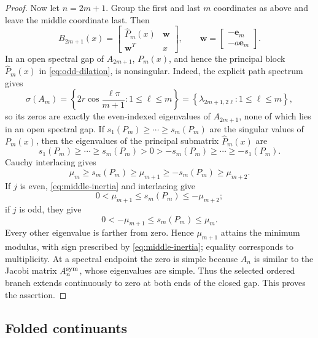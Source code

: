 \documentclass[11pt,a4paper]{article}
\numberwithin{equation}{section}
\begin{document}
\begin{proof}
Now let \(n=2m+1\).  Group the first and last \(m\) coordinates as
above and leave the middle coordinate last.  Then
\begin{equation}\label{eq:odd-dilation}
 B_{2m+1}(x)=
 \begin{bmatrix}\widehat P_m(x)&\boldsymbol w\\\boldsymbol w^T&x\end{bmatrix},
 \qquad
 \boldsymbol w=\begin{bmatrix}-\mathbf e_m\\-a\mathbf e_m\end{bmatrix}.
\end{equation}
In an open spectral gap of \(A_{2m+1}\), \(P_m(x)\), and hence the principal
block \(\widehat P_m(x)\) in \eqref{eq:odd-dilation}, is nonsingular.  Indeed,
the explicit path spectrum gives
\[
 \sigma(A_m)
 =\left\{2r\cos\frac{\ell\pi}{m+1}:1\leq\ell\leq m\right\}
 =\left\{\lambda_{2m+1,2\ell}:1\leq\ell\leq m\right\},
\]
so its zeros are exactly the even-indexed eigenvalues of \(A_{2m+1}\), none
of which lies in an open spectral gap.
If \(s_1(P_m)\geq\cdots\geq s_m(P_m)\) are the singular values of
\(P_m(x)\), then the eigenvalues of the principal submatrix
\(\widehat P_m(x)\) are
\[
 s_1(P_m)\geq\cdots\geq s_m(P_m)>0>
 -s_m(P_m)\geq\cdots\geq-s_1(P_m).
\]
Cauchy interlacing gives
\[
 \mu_m\geq s_m(P_m)\geq\mu_{m+1}
 \geq-s_m(P_m)\geq\mu_{m+2}.
\]
If \(j\) is even, \eqref{eq:middle-inertia} and interlacing give
\[
 0<\mu_{m+1}\leq s_m(P_m)\leq-\mu_{m+2};
\]
if \(j\) is odd, they give
\[
 0<-\mu_{m+1}\leq s_m(P_m)\leq\mu_m.
\]
Every other eigenvalue is farther from zero.  Hence
\(\mu_{m+1}\) attains the minimum modulus, with sign prescribed by
\eqref{eq:middle-inertia}; equality corresponds to multiplicity.  At a
spectral endpoint the zero is simple because \(A_n\) is similar to the
Jacobi matrix \(A_n^{\rm sym}\), whose eigenvalues are simple.  Thus the selected
ordered branch extends continuously to zero at both ends of the closed
gap.  This proves the assertion.
\end{proof}

\subsection{Folded continuants}
\label{subsec:folded-continuants}
\end{document}
